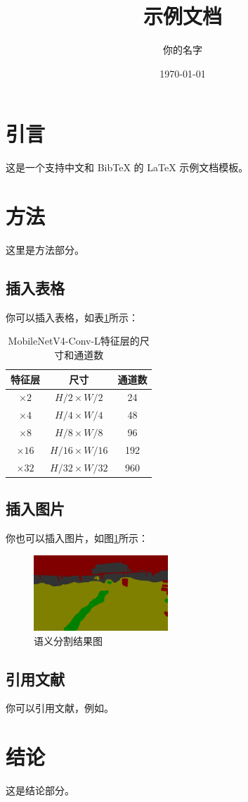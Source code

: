 \documentclass{article}
\begin{document}
\title{示例文档}
\author{你的名字}
\date{\today}
\maketitle

\section{引言}
这是一个支持中文和 BibTeX 的 LaTeX 示例文档模板。 

\section{方法}
这里是方法部分。

\subsection{插入表格}
你可以插入表格，如表\ref{tab:feature_map_sizes}所示：
  \begin{table}[hbt]
    \centering
    \caption{MobileNetV4-Conv-L特征层的尺寸和通道数} 
    \label{tab:feature_map_sizes}
    \begin{tabular*}{0.75\textwidth}{@{\extracolsep{\fill}}ccc}
    \toprule
      特征层 & 尺寸 & 通道数 \\
    \midrule
      \(\times2\)  & \(H/2 \times W/2\)   & 24 \\
      \(\times4\)  & \(H/4 \times W/4\)   & 48 \\
      \(\times8\)  & \(H/8 \times W/8\)   & 96 \\
      \(\times16\) & \(H/16 \times W/16\) & 192 \\
      \(\times32\) & \(H/32 \times W/32\) & 960 \\
    \bottomrule
    \end{tabular*}
  \end{table}

\subsection{插入图片}
你也可以插入图片，如图\ref{fig:seg}所示：
  \begin{figure}[hbt]
      \centering
      \includegraphics[width=0.45\textwidth]{figures/seg.png}
      \caption{语义分割结果图}\label{fig:seg}
     \end{figure}

\subsection{引用文献}
你可以引用文献，例如\cite{zhao2024autonomous}。

\section{结论}
这是结论部分。


\end{document}
